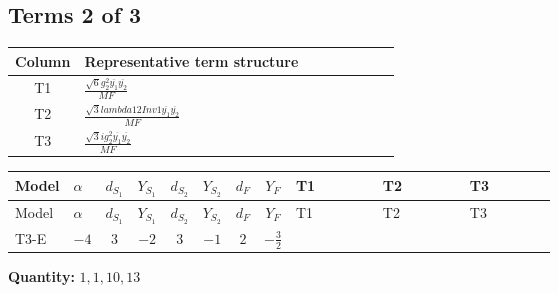 \documentclass[8pt]{article}
\begin{document}
\begin{landscape}
\subsection*{Terms 2 of 3}
\begin{center}
\begin{tabular}{@{}c >{\raggedright\arraybackslash}p{0.82\linewidth}@{}}
\toprule
Column & Representative term structure \\
\midrule
T1 & \(\displaystyle \frac{\sqrt{6} g_{2}^{2} \overline{y_{1}} \overline{y_{2}}}{MF}\) \\
\midrule
T2 & \(\displaystyle \frac{\sqrt{3} lambda12Inv1 \overline{y_{1}} \overline{y_{2}}}{MF}\) \\
\midrule
T3 & \(\displaystyle \frac{\sqrt{3} i g_{2}^{2} \overline{y_{1}} \overline{y_{2}}}{MF}\) \\
\midrule
\bottomrule
\end{tabular}
\end{center}
\smallskip
\tiny
\begin{longtable}{@{}llcccccc >{\raggedright\arraybackslash}p{0.21\linewidth} >{\raggedright\arraybackslash}p{0.21\linewidth} >{\raggedright\arraybackslash}p{0.21\linewidth}@{}}
\toprule
Model & $\alpha$ & $d_{S_1}$ & $Y_{S_1}$ & $d_{S_2}$ & $Y_{S_2}$ & $d_F$ & $Y_F$ & T1 & T2 & T3 \\
\midrule
\endfirsthead
\toprule
Model & $\alpha$ & $d_{S_1}$ & $Y_{S_1}$ & $d_{S_2}$ & $Y_{S_2}$ & $d_F$ & $Y_F$ & T1 & T2 & T3 \\
\midrule
\endhead
T3-E & $-4$ & $3$ & $-2$ & $3$ & $-1$ & $2$ & $-\frac{3}{2}$ & \scriptsize\adjustbox{max width=\linewidth}{$\begin{gathered} - \frac{\sqrt{6} g_{2}^{2} \overline{y_{1}} \overline{y_{2}}}{3 MF}\end{gathered}$} & \scriptsize\adjustbox{max width=\linewidth}{$\begin{gathered} \frac{\sqrt{3} lambda12Inv1 \overline{y_{1}} \overline{y_{2}}}{6 MF}\end{gathered}$} & \scriptsize\adjustbox{max width=\linewidth}{$\begin{gathered} \frac{\sqrt{3} i g_{2}^{2} \overline{y_{1}} \overline{y_{2}}}{6 MF}\end{gathered}$} \\
\midrule
\bottomrule
\end{longtable}
\clearpage
\noindent\textbf{Quantity: }$\mathrm{1,1,10,13}$\par\smallskip

\end{landscape}
\end{document}
